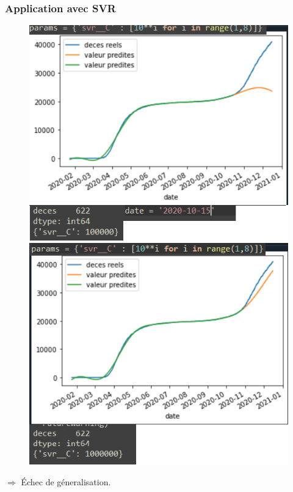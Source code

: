 \documentclass{beamer}[aspectratio = 43]
\begin{document}
\begin{frame}
	\frametitle{Application avec SVR}
	\begin{figure}[t]
		\centering
		\begin{minipage}{0.5\textwidth}
			\includegraphics[scale=0.32]{SVR_avant_pt_dinflexion}
		\end{minipage}%
		\begin{minipage}{0.5\textwidth}
			\includegraphics[scale=0.32]{SVR_apres_pt_dinflexion}
		\end{minipage}
	\end{figure}
	$\Rightarrow$ \'Echec de géneralisation.
\end{frame}
\end{document}
